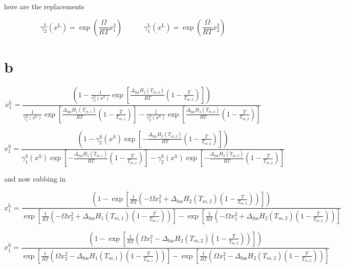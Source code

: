 \documentclass{article}
\begin{document}
here are the replacements

\[
\gamma_2^{\text{L}}(x^{\text{L}}) = \exp \left( \frac{\Omega}{RT} x_1^2 \right) \hspace{3em} \gamma_1^{\text{L}}(x^{\text{L}}) = \exp \left( \frac{\Omega}{RT} x_2^2 \right)
\]



\section{b}

\[
x_1^{\text{L}} =
\frac{
\left(1 - \frac{1}{\gamma_2^{\text{S}}(x^{\text{S}})} 
\exp\left[ \frac{\Delta_{\text{fus}} H_2 (T_{m,2})}{RT} \left( 1 - \frac{T}{T_{m,2}} \right) \right] \right)
}
{
\frac{1}{\gamma_1^{\text{S}}(x^{\text{S}})} 
\exp\left[ \frac{\Delta_{\text{fus}} H_1 (T_{m,1})}{RT} \left( 1 - \frac{T}{T_{m,1}} \right) \right]
- \frac{1}{\gamma_2^{\text{S}}(x^{\text{S}})} 
\exp\left[ \frac{\Delta_{\text{fus}} H_2 (T_{m,2})}{RT} \left( 1 - \frac{T}{T_{m,2}} \right) \right]
}
\]

\[
x_1^{\text{S}} =
\frac{
\left(1 - \gamma_2^{\text{S}}(x^{\text{S}})
\exp\left[ -\frac{\Delta_{\text{fus}} H_2 (T_{m,2})}{RT} \left( 1 - \frac{T}{T_{m,2}} \right) \right] \right)
}
{
\gamma_1^{\text{S}}(x^{\text{S}})
\exp\left[ -\frac{\Delta_{\text{fus}} H_1 (T_{m,1})}{RT} \left( 1 - \frac{T}{T_{m,1}} \right) \right]
- \gamma_2^{\text{S}}(x^{\text{S}})
\exp\left[ -\frac{\Delta_{\text{fus}} H_2 (T_{m,2})}{RT} \left( 1 - \frac{T}{T_{m,2}} \right) \right]
}
\]

and now subbing in

\large


\[
x_1^{\text{L}} =
\frac{
\left(1 - \exp \left[
\frac{1}{RT} \left(
-\Omega x_1^2 + \Delta_{\text{fus}} H_2 (T_{m,2}) \left(1 - \frac{T}{T_{m,2}} \right)
\right)
\right] \right)
}
{
\exp \left[
\frac{1}{RT} \left(
-\Omega x_2^2 + \Delta_{\text{fus}} H_1 (T_{m,1}) \left(1 - \frac{T}{T_{m,1}} \right)
\right)
\right]
-
\exp \left[
\frac{1}{RT} \left(
-\Omega x_1^2 + \Delta_{\text{fus}} H_2 (T_{m,2}) \left(1 - \frac{T}{T_{m,2}} \right)
\right)
\right]
}
\]

\[
x_1^{\text{S}} =
\frac{
\left(1 - \exp \left[
\frac{1}{RT} \left(
\Omega x_1^2 - \Delta_{\text{fus}} H_2 (T_{m,2}) \left(1 - \frac{T}{T_{m,2}} \right)
\right)
\right] \right)
}
{
\exp \left[
\frac{1}{RT} \left(
\Omega x_2^2 - \Delta_{\text{fus}} H_1 (T_{m,1}) \left(1 - \frac{T}{T_{m,1}} \right)
\right)
\right]
-
\exp \left[
\frac{1}{RT} \left(
\Omega x_1^2 - \Delta_{\text{fus}} H_2 (T_{m,2}) \left(1 - \frac{T}{T_{m,2}} \right)
\right)
\right]
}
\]
\end{document}

